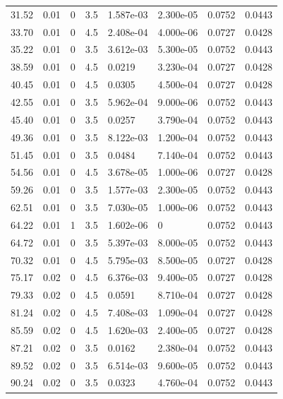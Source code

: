 \documentclass[preview]{standalone}
\begin{document}
{{\begin{tabular}{L{1.2cm}C{1.2cm} C{0.3cm}C{0.5cm} C{1.4cm}C{1.4cm} C{1.4cm}C{1.4cm}}
  31.52  &  0.01  & 0     & 3.5 &  1.587e-03  & 2.300e-05  & 0.0752 &  0.0443   \\ 
  33.70  &  0.01  & 0     & 4.5 &  2.408e-04  & 4.000e-06  & 0.0727 &  0.0428   \\ 
  35.22  &  0.01  & 0     & 3.5 &  3.612e-03  & 5.300e-05  & 0.0752 &  0.0443   \\ 
  38.59  &  0.01  & 0     & 4.5 &  0.0219  & 3.230e-04  & 0.0727 &  0.0428   \\ 
  40.45  &  0.01  & 0     & 4.5 &  0.0305  & 4.500e-04  & 0.0727 &  0.0428   \\ 
  42.55  &  0.01  & 0     & 3.5 &  5.962e-04  & 9.000e-06  & 0.0752 &  0.0443   \\ 
  45.40  &  0.01  & 0     & 3.5 &  0.0257  & 3.790e-04  & 0.0752 &  0.0443   \\ 
  49.36  &  0.01  & 0     & 3.5 &  8.122e-03  & 1.200e-04  & 0.0752 &  0.0443   \\ 
  51.45  &  0.01  & 0     & 3.5 &  0.0484  & 7.140e-04  & 0.0752 &  0.0443   \\ 
  54.56  &  0.01  & 0     & 4.5 &  3.678e-05  & 1.000e-06  & 0.0727 &  0.0428   \\ 
  59.26  &  0.01  & 0     & 3.5 &  1.577e-03  & 2.300e-05  & 0.0752 &  0.0443   \\ 
  62.51  &  0.01  & 0     & 3.5 &  7.030e-05  & 1.000e-06  & 0.0752 &  0.0443   \\ 
  64.22  &  0.01  & 1     & 3.5 &  1.602e-06  & 0  & 0.0752 &  0.0443   \\ 
  64.72  &  0.01  & 0     & 3.5 &  5.397e-03  & 8.000e-05  & 0.0752 &  0.0443   \\ 
  70.32  &  0.01  & 0     & 4.5 &  5.795e-03  & 8.500e-05  & 0.0727 &  0.0428   \\ 
  75.17  &  0.02  & 0     & 4.5 &  6.376e-03  & 9.400e-05  & 0.0727 &  0.0428   \\ 
  79.33  &  0.02  & 0     & 4.5 &  0.0591  & 8.710e-04  & 0.0727 &  0.0428   \\ 
  81.24  &  0.02  & 0     & 4.5 &  7.408e-03  & 1.090e-04  & 0.0727 &  0.0428   \\ 
  85.59  &  0.02  & 0     & 4.5 &  1.620e-03  & 2.400e-05  & 0.0727 &  0.0428   \\ 
  87.21  &  0.02  & 0     & 3.5 &  0.0162  & 2.380e-04  & 0.0752 &  0.0443   \\ 
  89.52  &  0.02  & 0     & 3.5 &  6.514e-03  & 9.600e-05  & 0.0752 &  0.0443   \\ 
  90.24  &  0.02  & 0     & 3.5 &  0.0323  & 4.760e-04  & 0.0752 &  0.0443   \\ 

\end{tabular}}}
\end{document}
